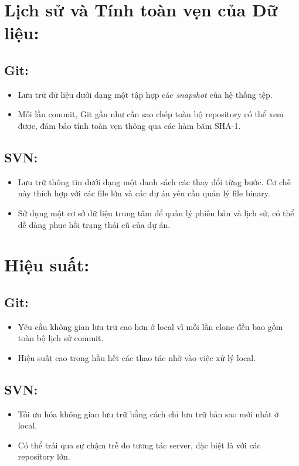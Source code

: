 \section{Lịch sử và Tính toàn vẹn của Dữ liệu:}
\subsection{Git:}
\begin{itemize}
    \item Lưu trữ dữ liệu dưới dạng một tập hợp các \textit{snapshot} của hệ thống tệp.
    \item Mỗi lần commit, Git gần như cần sao chép toàn bộ repository có thể xem được, đảm bảo tính toàn vẹn thông qua các hàm băm SHA-1.
\end{itemize}

\subsection{SVN:}
\begin{itemize}
    \item Lưu trữ thông tin dưới dạng một danh sách các thay đổi từng bước. Cơ chế này thích hợp với các file lớn và các dự án yêu cầu quản lý file binary.
    \item Sử dụng một cơ sở dữ liệu trung tâm để quản lý phiên bản và lịch sử, có thể dễ dàng phục hồi trạng thái cũ của dự án.
\end{itemize}

\section{Hiệu suất:}
\subsection{Git:}
\begin{itemize}
    \item Yêu cầu không gian lưu trữ cao hơn ở local vì mỗi lần clone đều bao gồm toàn bộ lịch sử commit.
    \item Hiệu suất cao trong hầu hết các thao tác nhờ vào việc xử lý local.
\end{itemize}

\subsection{SVN:}
\begin{itemize}
    \item Tối ưu hóa không gian lưu trữ bằng cách chỉ lưu trữ bản sao mới nhất ở local.
    \item Có thể trải qua sự chậm trễ do tương tác server, đặc biệt là với các repository lớn.
\end{itemize}

